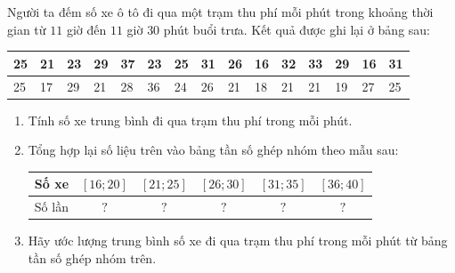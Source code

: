 \begin{ex}%
	Người ta đếm số xe ô tô đi qua một trạm thu phí mỗi phút trong  khoảng thời gian từ $11$ giờ đến $11$ giờ $30$ phút buổi trưa. Kết quả được ghi lại ở bảng sau:
	\begin{center}
		\begin{tabular}{|l|l|l|l|l|l|l|l|l|l|l|l|l|l|l|}
			\hline 25 & 21 & 23 & 29 & 37 &  23 & 25 & 31 & 26 & 16 & 32 & 33 & 29 & 16 & 31 \\
			 \hline 25 & 17 & 29 & 21 & 28 & 36 & 24 & 26 & 21 & 18 & 21 & 21 & 19 & 27 & 25 \\
			 \hline
		\end{tabular}
	\end{center}
	\begin{enumerate}
		\item Tính số xe trung bình đi qua  trạm thu phí trong mỗi phút.
		\item Tổng hợp lại số liệu trên vào bảng  tần số ghép nhóm theo mẫu sau:
		\begin{center}
			\begin{tabular}{|l|c|c|c|c|c|}
				\hline Số xe & $[16;  20] $ & $[21; 25] $ & $[26; 30] $ & $[31; 35] $ & $[36; 40] $ \\
				\hline Số lần & $ ? $ & $ ? $ & $ ? $ & $ ? $ & $ ? $ \\ 
				\hline 
			\end{tabular}
		\end{center}
		\item Hãy ước lượng trung bình số xe đi  qua trạm thu phí trong mỗi phút từ bảng tần số ghép nhóm trên.
	\end{enumerate}
\end{ex}

